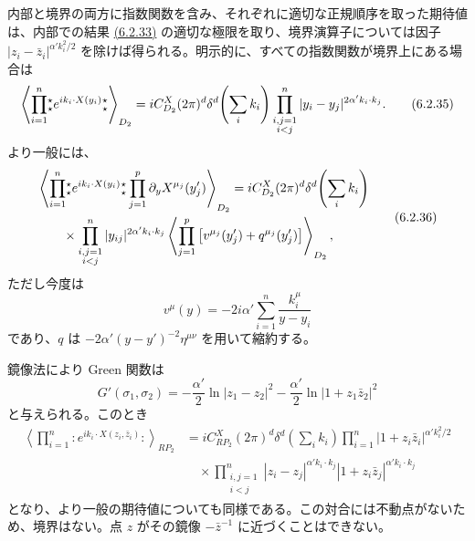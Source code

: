 内部と境界の両方に指数関数を含み、それぞれに適切な正規順序を取った期待値は、内部での結果 \hyperref[eq:6.2.33]{(6.2.33)} の適切な極限を取り、境界演算子については因子 $|z_i-\bar z_i|^{\alpha'k_i^2/2}$ を除けば得られる。明示的に、すべての指数関数が境界上にある場合は
\begin{equation}
\left\langle\prod_{i=1}^n\mathopen{{}^{\star}_{\star}}e^{ik_i\cdot X(y_i)}\mathclose{{}^{\star}_{\star}}\right\rangle_{D_2}
=iC_{D_2}^X(2\pi)^d\delta^d\!\left(\sum_i k_i\right)
\prod_{\substack{i,j=1\\i<j}}^n|y_i-y_j|^{2\alpha'k_i\cdot k_j}.
\tag{6.2.35}\label{eq:6.2.35}
\end{equation}
より一般には、
\begin{equation}
\begin{aligned}
&\left\langle\prod_{i=1}^n\mathopen{{}^{\star}_{\star}}e^{ik_i\cdot X(y_i)}\mathclose{{}^{\star}_{\star}}
\prod_{j=1}^p\partial_yX^{\mu_j}(y'_j)\right\rangle_{D_2}
=iC_{D_2}^X(2\pi)^d\delta^d\!\left(\sum_i k_i\right)\\
&\qquad\times\prod_{\substack{i,j=1\\i<j}}^n|y_{ij}|^{2\alpha'k_i\cdot k_j}
\left\langle\prod_{j=1}^p\left[v^{\mu_j}(y'_j)+q^{\mu_j}(y'_j)\right]\right\rangle_{D_2},
\end{aligned}
\tag{6.2.36}\label{eq:6.2.36}
\end{equation}
ただし今度は
\begin{equation}
v^\mu(y)=-2i\alpha'\sum_{i=1}^n\frac{k_i^\mu}{y-y_i}
\tag{6.2.37}\label{eq:6.2.37}
\end{equation}
であり、$q$ は $-2\alpha'(y-y')^{-2}\eta^{\mu\nu}$ を用いて縮約する。


鏡像法により Green 関数は
\begin{equation}
G'(\sigma_1,\sigma_2)=-\frac{\alpha'}2\ln|z_1-z_2|^2
-\frac{\alpha'}2\ln|1+z_1\bar z_2|^2
\tag{6.2.38}\label{eq:6.2.38}
\end{equation}
と与えられる。このとき
\begin{equation}
\begin{aligned}
\left\langle\prod_{i=1}^n:e^{ik_i\cdot X(z_i,\bar z_i)}:\right\rangle_{RP_2}
&=iC_{RP_2}^X(2\pi)^d\delta^d\!\left(\sum_i k_i\right)
\prod_{i=1}^n|1+z_i\bar z_i|^{\alpha'k_i^2/2}\\
&\quad\times\prod_{\substack{i,j=1\\i<j}}^n
|z_i-z_j|^{\alpha'k_i\cdot k_j}|1+z_i\bar z_j|^{\alpha'k_i\cdot k_j}
\end{aligned}
\tag{6.2.39}\label{eq:6.2.39}
\end{equation}
となり、より一般の期待値についても同様である。この対合には不動点がないため、境界はない。点 $z$ がその鏡像 $-\bar z^{-1}$ に近づくことはできない。

